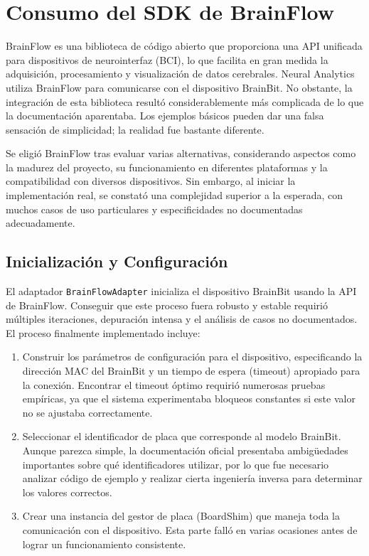 \section{Consumo del SDK de BrainFlow}

BrainFlow es una biblioteca de código abierto que proporciona una API unificada para dispositivos de neurointerfaz (BCI), lo que facilita en gran medida la adquisición, procesamiento y visualización de datos cerebrales. Neural Analytics utiliza BrainFlow para comunicarse con el dispositivo BrainBit. No obstante, la integración de esta biblioteca resultó considerablemente más complicada de lo que la documentación aparentaba. Los ejemplos básicos pueden dar una falsa sensación de simplicidad; la realidad fue bastante diferente.

Se eligió BrainFlow tras evaluar varias alternativas, considerando aspectos como la madurez del proyecto, su funcionamiento en diferentes plataformas y la compatibilidad con diversos dispositivos. Sin embargo, al iniciar la implementación real, se constató una complejidad superior a la esperada, con muchos casos de uso particulares y especificidades no documentadas adecuadamente.

\subsection{Inicialización y Configuración}

El adaptador \texttt{BrainFlowAdapter} inicializa el dispositivo BrainBit usando la API de BrainFlow. Conseguir que este proceso fuera robusto y estable requirió múltiples iteraciones, depuración intensa y el análisis de casos no documentados. El proceso finalmente implementado incluye:

\begin{enumerate}
    \item Construir los parámetros de configuración para el dispositivo, especificando la dirección MAC del BrainBit y un tiempo de espera (timeout) apropiado para la conexión. Encontrar el timeout óptimo requirió numerosas pruebas empíricas, ya que el sistema experimentaba bloqueos constantes si este valor no se ajustaba correctamente.
    \item Seleccionar el identificador de placa que corresponde al modelo BrainBit. Aunque parezca simple, la documentación oficial presentaba ambigüedades importantes sobre qué identificadores utilizar, por lo que fue necesario analizar código de ejemplo y realizar cierta ingeniería inversa para determinar los valores correctos.
    \item Crear una instancia del gestor de placa (BoardShim) que maneja toda la comunicación con el dispositivo. Esta parte falló en varias ocasiones antes de lograr un funcionamiento consistente.
\end{enumerate}

